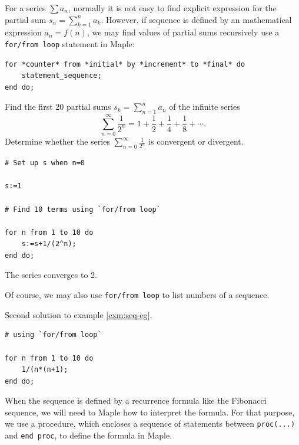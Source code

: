 \documentclass[
  en,11pt,simple]{elegantbook}
\renewenvironment{example}[1][]{
  \refstepcounter{exam}
  \par\noindent\textbf{\color{main}{\examplename} \theexam #1}
  \rmfamily
}{
  \par\ignorespacesafterend
}
\begin{document}
For a series \(\sum a_n\), normally it is not easy to find explicit expression for the partial sum \(s_n=\sum\limits_{k=1}^n a_k\). However, if sequence is defined by an mathematical expression \(a_n=f(n)\), we may find values of partial sums recursively use a \texttt{for/from\ loop} statement in Maple:

\begin{verbatim}
for *counter* from *initial* by *increment* to *final* do
    statement_sequence;
end do;
\end{verbatim}

\begin{example}

Find the first 20 partial sums \(s_k=\sum_{n=1}^{n}a_n\) of the infinite series
\[
\sum_{n=0}^\infty\frac1{2^n}=1+\frac12+\frac14+\frac18+\cdots.
\]
Determine whether the series \(\sum_{n=0}^\infty\frac1{2^n}\) is convergent or divergent.
\end{example}

\begin{solution}
{}

\begin{verbatim}
# Set up s when n=0

s:=1

# Find 10 terms using `for/from loop`

for n from 1 to 10 do
    s:=s+1/(2^n);
end do;
\end{verbatim}

The series converges to 2.
\end{solution}

Of course, we may also use \texttt{for/from\ loop} to list numbers of a sequence.

\begin{solution}
{}Second solution to example \ref{exm:seq-eg}.

\begin{verbatim}
# using `for/from loop`

for n from 1 to 10 do
    1/(n*(n+1);
end do;
\end{verbatim}
\end{solution}

When the sequence is defined by a recurrence formula like the Fibonacci sequence, we will need to Maple how to interpret the formula. For that purpose, we use a procedure, which encloses a sequence of statements between \texttt{proc(...)} and \texttt{end\ proc}, to define the formula in Maple.
\end{document}
